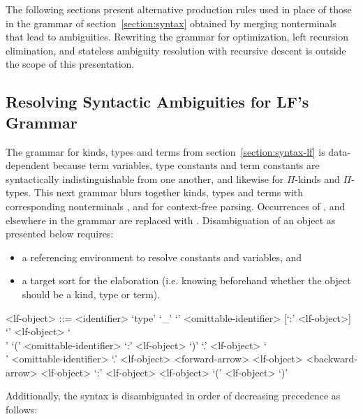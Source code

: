 The following sections present alternative production rules used in place of those in the grammar of section~\ref{section:syntax} obtained by merging nonterminals that lead to ambiguities.
Rewriting the grammar for optimization, left recursion elimination, and stateless ambiguity resolution with recursive descent is outside the scope of this presentation.

\subsection{Resolving Syntactic Ambiguities for \acs{LF}'s Grammar}\label{section:blurred-lf-syntax}

The grammar for \LF kinds, types and terms from section~\ref{section:syntax-lf} is data-dependent because \LF term variables, type constants and term constants are syntactically indistinguishable from one another, and likewise for $ \Pi $-kinds and $ \Pi $-types.
This next grammar blurs together \LF kinds, types and terms with corresponding nonterminals ,  and  for context-free parsing.
Occurrences of ,  and  elsewhere in the grammar are replaced with .
Disambiguation of an \LF object as presented below requires:
\begin{itemize}
\item a referencing environment to resolve constants and variables, and
\item a target sort for the elaboration (i.e. knowing beforehand whether the \LF object should be a kind, type or term).
\end{itemize}

\begin{grammar}
<lf-object> ::= <identifier>
\alt `type'
\alt `_'
\alt `{' <omittable-identifier> [`:' <lf-object>] `}' <lf-object>
\alt `\\' `(' <omittable-identifier> `:' <lf-object> `)' `.' <lf-object>
\alt `\\' <omittable-identifier> `.' <lf-object>
 <forward-arrow> <lf-object>
 <backward-arrow> <lf-object>
 `:' <lf-object>
 <lf-object>
\alt `(' <lf-object> `)'
\end{grammar}

Additionally, the syntax is disambiguated in order of decreasing precedence as follows:

